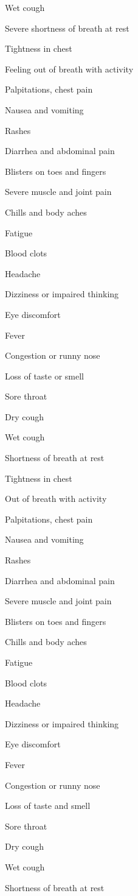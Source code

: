 Wet cough

Severe shortness of breath at rest

Tightness in chest

Feeling out of breath with activity

Palpitations, chest pain

Nausea and vomiting

Rashes

Diarrhea and abdominal pain

Blisters on toes and fingers

Severe muscle and joint pain

Chills and body aches

Fatigue

Blood clots

Headache

Dizziness or impaired thinking

Eye discomfort

Fever

Congestion or runny nose

Loss of taste or smell

Sore throat

Dry cough

Wet cough

Shortness of breath at rest

Tightness in chest

Out of breath with activity

Palpitations, chest pain

Nausea and vomiting

Rashes

Diarrhea and abdominal pain

Severe muscle and joint pain

Blisters on toes and fingers

Chills and body aches

Fatigue

Blood clots

Headache

Dizziness or impaired thinking

Eye discomfort

Fever

Congestion or runny nose

Loss of taste and smell

Sore throat

Dry cough

Wet cough

Shortness of breath at rest

